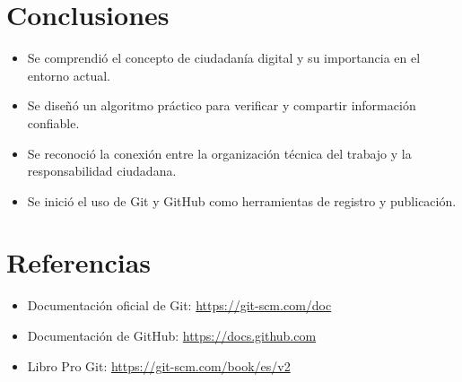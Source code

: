 \documentclass[12pt,a4paper]{article}
\begin{document}
\section{Conclusiones}

\begin{itemize}
    \item Se comprendió el concepto de ciudadanía digital y su importancia en el entorno actual.
    \item Se diseñó un algoritmo práctico para verificar y compartir información confiable.
    \item Se reconoció la conexión entre la organización técnica del trabajo y la responsabilidad ciudadana.
    \item Se inició el uso de Git y GitHub como herramientas de registro y publicación.
\end{itemize}

\section{Referencias}

\begin{itemize}
    \item Documentación oficial de Git: \url{https://git-scm.com/doc}
    \item Documentación de GitHub: \url{https://docs.github.com}
    \item Libro Pro Git: \url{https://git-scm.com/book/es/v2}
\end{itemize}
\end{document}

